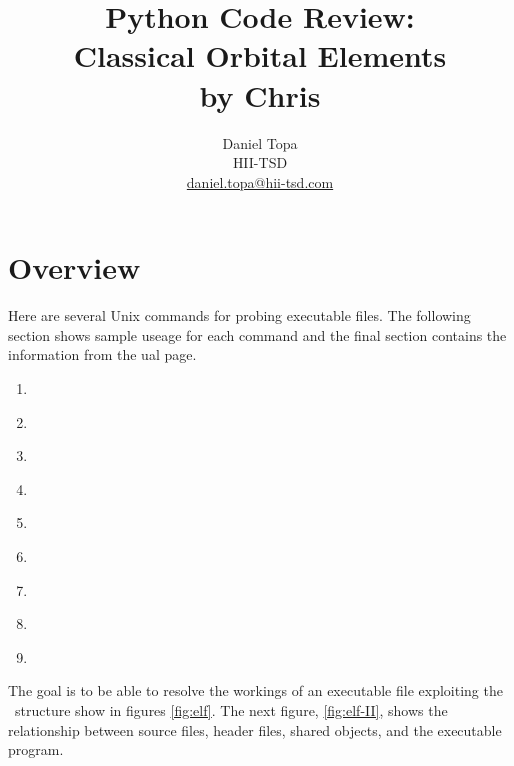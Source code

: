 \documentclass[10pt, oneside]{article}   	%
\title{Python Code Review:\\ Classical Orbital Elements\\by Chris}
\author{Daniel Topa\\HII-TSD\\\href{mailto:daniel.topa@hii-tsd.com}{daniel.topa@hii-tsd.com}}
\begin{document}
\maketitle
{}
\tableofcontents

\section{Overview}
Here are several Unix commands for probing executable files. The following section shows sample useage for each command and the final section contains the information from the ual page.
\begin{enumerate}
	\item \hyperref[sec:ldd]{\ldd}
	\item \hyperref[sec:ldd]{\lddconfig}
	\item \hyperref[sec:locate]{\locate}
	\item \hyperref[sec:objdump]{\objdump}
	\item \hyperref[sec:lsof]{\lsof}
	\item \hyperref[sec:readelf]{\readelf}
	\item \hyperref[sec:nm]{\nm}
	\item \hyperref[sec:strace]{\strace}
	\item \hyperref[sec:strings]{\strings}
\end{enumerate}

The goal is to be able to resolve the workings of an executable file exploiting the \elf \ structure show in figures \ref{fig:elf}. The next figure, \ref{fig:elf-II}, shows the relationship between source files, header files, shared objects, and the executable program.

	
\end{document}
